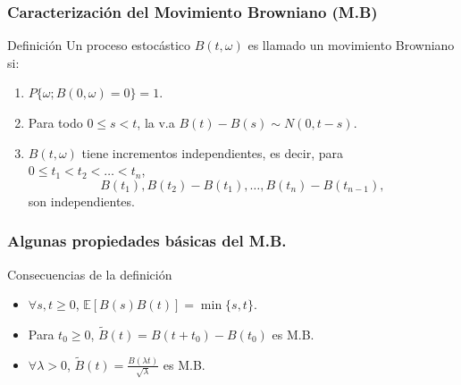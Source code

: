 \begin{frame}
	\frametitle{Caracterización del Movimiento Browniano (M.B)}
	\begin{block}{Definici\'on}
		Un proceso estoc\'astico $B(t,\omega)$ es llamado un movimiento Browniano si:
		\begin{enumerate}
			\item $P\{\omega;B(0,\omega)=0\}=1$.
			\item Para todo $0\leq s < t$, la v.a $B(t) - B(s)\sim N(0,t -s)$.
			\item $B(t,\omega)$ tiene incrementos independientes, es decir, para 
				$0\leq t_{1} < t_{2}	<\ldots < t_{n}$,
				\begin{equation*}
					B(t_{1}), B(t_{2}) - B(t_{1}),\ldots,B(t_{n}) - B(t_{n-1}),
				\end{equation*}
				son independientes.
		\end{enumerate}
	\end{block}
\end{frame}
\begin{frame}
	\frametitle{Algunas propiedades b\'asicas del M.B.}
	\begin{exampleblock}{Consecuencias de la definición}
		\begin{itemize}[<+-|alert@+>]
			\item $\displaystyle \forall s,t\geq 0$, $\mathbb{E}[B(s)B(t)]=\min\{s,t\}$.
			\item Para $t_{0}\geq 0$, $\tilde{B}(t)=B(t+t_{0}) - B(t_{0})$  es M.B.
			\item $ \forall \lambda > 0$, 
				$\displaystyle \tilde{B}(t)=\frac {B(\lambda t)}{\sqrt{\lambda}}$ 
				es  M.B.
		\end{itemize}
	\end{exampleblock}
\end{frame}
\begin{frame}
	\only<+>{
		\begin{definicion}[$H$ - similar]
			Un p.e. $(X(t),t\in [0,\infty)$ es $H$-similar si $\exists H > 0$ t.q.  								
\begin{align*}
				(T^{H}X(t_{1}),\ldots,T^{H}X(t_{n}))
				&\overset{ \mathcal{D} }{ = }
				(X(Tt_{1}),\ldots,X(Tt_{n})) \\
				\forall T > 0& \quad t_{i} \in \mathcal{P}([a,b]).			
			\end{align*}
		\end{definicion}
	}
\end{frame}
